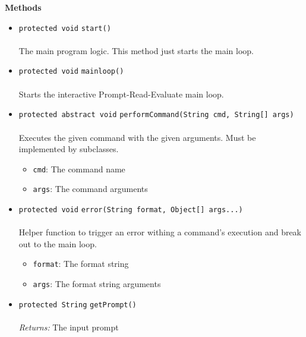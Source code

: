 \textbf{\sffamily Methods}
\begin{itemize}
\item \lstinline|protected void| \lstinline|start|\lstinline|()|\\ \\[-0.6em]
The main program logic. This method just starts the main loop.



\item \lstinline|protected void| \lstinline|mainloop|\lstinline|()|\\ \\[-0.6em]
Starts the interactive Prompt-Read-Evaluate main loop.



\item \lstinline|protected abstract void| \lstinline|performCommand|\lstinline|(String cmd, String[] args)|\\ \\[-0.6em]
Executes the given command with the given arguments. Must be implemented by subclasses.
\begin{itemize}
\item \lstinline|cmd|: The command name
\item \lstinline|args|: The command arguments
\end{itemize}



\item \lstinline|protected void| \lstinline|error|\lstinline|(String format, Object[] args...)|\\ \\[-0.6em]
Helper function to trigger an error withing a command's execution and break out to
 the main loop.
\begin{itemize}
\item \lstinline|format|: The format string
\item \lstinline|args|: The format string arguments
\end{itemize}



\item \lstinline|protected String| \lstinline|getPrompt|\lstinline|()|\\ \\[-0.6em]
\emph{Returns:} The input prompt



\end{itemize}

